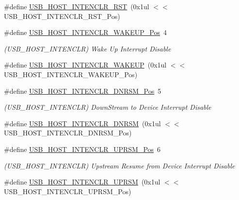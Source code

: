 \begin{DoxyCompactItemize}
\#define \mbox{\hyperlink{group___s_a_m_d21___u_s_b_ga111111eb157c1236b4ac9a5d3eb93ea0}{U\+S\+B\+\_\+\+H\+O\+S\+T\+\_\+\+I\+N\+T\+E\+N\+C\+L\+R\+\_\+\+R\+ST}}~(0x1ul $<$$<$ U\+S\+B\+\_\+\+H\+O\+S\+T\+\_\+\+I\+N\+T\+E\+N\+C\+L\+R\+\_\+\+R\+S\+T\+\_\+\+Pos)
\item 
\#define \mbox{\hyperlink{group___s_a_m_d21___u_s_b_ga79300961ec1ec94d4761d702bf40b21f}{U\+S\+B\+\_\+\+H\+O\+S\+T\+\_\+\+I\+N\+T\+E\+N\+C\+L\+R\+\_\+\+W\+A\+K\+E\+U\+P\+\_\+\+Pos}}~4
\begin{DoxyCompactList}\small\item\em (U\+S\+B\+\_\+\+H\+O\+S\+T\+\_\+\+I\+N\+T\+E\+N\+C\+LR) Wake Up Interrupt Disable \end{DoxyCompactList}\item 
\#define \mbox{\hyperlink{group___s_a_m_d21___u_s_b_ga93cf0faa802eb5ce37b3438544e94900}{U\+S\+B\+\_\+\+H\+O\+S\+T\+\_\+\+I\+N\+T\+E\+N\+C\+L\+R\+\_\+\+W\+A\+K\+E\+UP}}~(0x1ul $<$$<$ U\+S\+B\+\_\+\+H\+O\+S\+T\+\_\+\+I\+N\+T\+E\+N\+C\+L\+R\+\_\+\+W\+A\+K\+E\+U\+P\+\_\+\+Pos)
\item 
\#define \mbox{\hyperlink{group___s_a_m_d21___u_s_b_gaff35d18b263ecec920220f990a1bdba3}{U\+S\+B\+\_\+\+H\+O\+S\+T\+\_\+\+I\+N\+T\+E\+N\+C\+L\+R\+\_\+\+D\+N\+R\+S\+M\+\_\+\+Pos}}~5
\begin{DoxyCompactList}\small\item\em (U\+S\+B\+\_\+\+H\+O\+S\+T\+\_\+\+I\+N\+T\+E\+N\+C\+LR) Down\+Stream to Device Interrupt Disable \end{DoxyCompactList}\item 
\#define \mbox{\hyperlink{group___s_a_m_d21___u_s_b_gaa66f348f070adac5c8e55046ed9794cb}{U\+S\+B\+\_\+\+H\+O\+S\+T\+\_\+\+I\+N\+T\+E\+N\+C\+L\+R\+\_\+\+D\+N\+R\+SM}}~(0x1ul $<$$<$ U\+S\+B\+\_\+\+H\+O\+S\+T\+\_\+\+I\+N\+T\+E\+N\+C\+L\+R\+\_\+\+D\+N\+R\+S\+M\+\_\+\+Pos)
\item 
\#define \mbox{\hyperlink{group___s_a_m_d21___u_s_b_ga17896ebf36d580baaea2f47f877c301c}{U\+S\+B\+\_\+\+H\+O\+S\+T\+\_\+\+I\+N\+T\+E\+N\+C\+L\+R\+\_\+\+U\+P\+R\+S\+M\+\_\+\+Pos}}~6
\begin{DoxyCompactList}\small\item\em (U\+S\+B\+\_\+\+H\+O\+S\+T\+\_\+\+I\+N\+T\+E\+N\+C\+LR) Upstream Resume from Device Interrupt Disable \end{DoxyCompactList}\item 
\#define \mbox{\hyperlink{group___s_a_m_d21___u_s_b_gaed82d6a9a093922be5f5dad9208cf3af}{U\+S\+B\+\_\+\+H\+O\+S\+T\+\_\+\+I\+N\+T\+E\+N\+C\+L\+R\+\_\+\+U\+P\+R\+SM}}~(0x1ul $<$$<$ U\+S\+B\+\_\+\+H\+O\+S\+T\+\_\+\+I\+N\+T\+E\+N\+C\+L\+R\+\_\+\+U\+P\+R\+S\+M\+\_\+\+Pos)

\end{DoxyCompactItemize}
